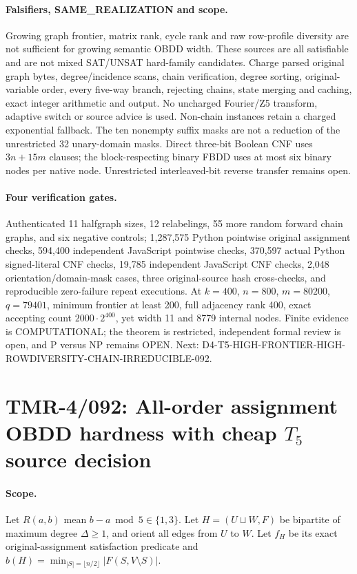 \documentclass[11pt]{article}
\begin{document}
\paragraph{Falsifiers, SAME\_REALIZATION and scope.}
Growing graph frontier, matrix rank, cycle rank and raw row-profile
diversity are not sufficient for growing semantic OBDD width.
These sources are all satisfiable and are not mixed SAT/UNSAT
hard-family candidates. Charge parsed original graph bytes,
degree/incidence scans, chain verification, degree sorting,
original-variable order, every five-way branch, rejecting chains,
state merging and caching, exact integer arithmetic and output.
No uncharged Fourier/Z5 transform, adaptive switch or source
advice is used. Non-chain instances retain a charged exponential
fallback. The ten nonempty suffix masks are not a reduction of
the unrestricted 32 unary-domain masks. Direct three-bit Boolean
CNF uses $3n+15m$ clauses; the block-respecting binary FBDD
uses at most six binary nodes per native node. Unrestricted
interleaved-bit reverse transfer remains open.

\paragraph{Four verification gates.}
Authenticated 11 halfgraph sizes, 12 relabelings, 55 more
random forward chain graphs, and six negative controls;
1,287,575 Python pointwise original assignment checks,
594,400 independent JavaScript pointwise checks, 370,597
actual Python signed-literal CNF checks, 19,785 independent
JavaScript CNF checks, 2,048 orientation/domain-mask cases,
three original-source hash cross-checks, and reproducible
zero-failure repeat executions. At $k=400$, $n=800$, $m=80200$,
$q=79401$, minimum frontier at least 200, full adjacency rank
400, exact accepting count $2000\cdot2^{400}$, yet width 11
and 8779 internal nodes. Finite evidence is COMPUTATIONAL;
the theorem is restricted, independent formal review is open,
and P versus NP remains OPEN.
Next: D4-T5-HIGH-FRONTIER-HIGH-ROWDIVERSITY-CHAIN-IRREDUCIBLE-092.


\section{TMR-4/092: All-order assignment OBDD hardness with cheap $T_5$ source decision}
\paragraph{Scope.}
Let $R(a,b)$ mean $b-a\bmod5\in\{1,3\}$.
Let $H=(U\sqcup W,F)$ be bipartite of maximum degree
$\Delta\ge1$, and orient all edges from $U$ to $W$.
Let $f_H$ be its exact original-assignment satisfaction predicate
and $b(H)=\min_{|S|=\lfloor n/2\rfloor}|F(S,V\setminus S)|$.
\end{document}
